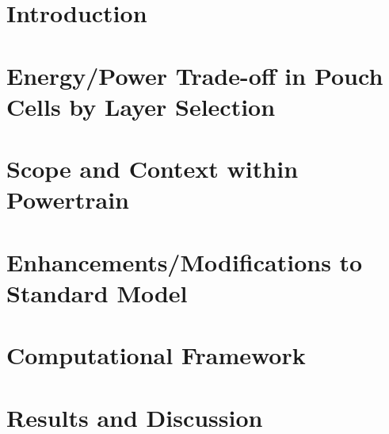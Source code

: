 \section[Introduction]{Introduction}\label{sec:layeroptintro}


\section{Energy/Power Trade-off in Pouch Cells by Layer Selection}\label{sec:energypowertradeoff}


\section{Scope and Context within  Powertrain}


\section{Enhancements/Modifications to Standard  Model}\label{sec:numericalenhancements}


\section{Computational Framework}\label{sec:layeroptframework}


\section{Results and Discussion}\label{sec:resultslayeropt}


% 






